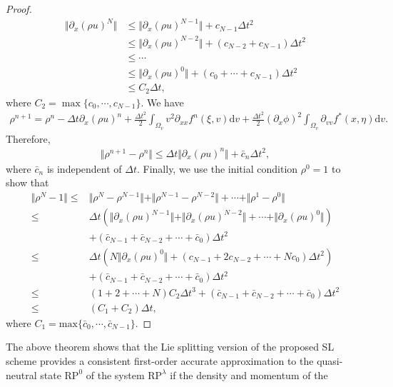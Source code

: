 \documentclass[letterpaper,10pt]{article}
\numberwithin{equation}{section}
\numberwithin{figure}{section}
\numberwithin{table}{section}
\begin{document}
\begin{proof}
\begin{align*}
    \Vert \partial_x(\rho u)^N\Vert&\leq\Vert\partial_x(\rho u)^{N-1}\Vert+c_{N-1}\Delta t^2\\
    &\leq\Vert\partial_x(\rho u)^{N-2}\Vert+(c_{N-2}+c_{N-1})\Delta t^2\\
    &\leq\cdots\\
    &\leq\Vert\partial_x(\rho u)^0\Vert+(c_0+\cdots+c_{N-1})\Delta t^2\\
    &\leq C_2\Delta t,
\end{align*}
where $C_2=\max\{c_0,\cdots,c_{N-1}\}$. We have
\begin{align*}
    \rho^{n+1}=\rho^n-\Delta t\partial_x(\rho u)^n+\frac{\Delta t^2}{2}\int_{\Omega_v}v^2\partial_{xx}f^n(\xi,v)\mathrm dv+\frac{\Delta t^2}{2}(\partial_x\phi)^2\int_{\Omega_v}\partial_{vv}f^*(x,\eta)\mathrm dv.
\end{align*}
Therefore,
\begin{align*}
    \Vert\rho^{n+1}-\rho^n\Vert\leq\Delta t\Vert\partial_x(\rho u)^n\Vert+\bar{c}_{n}\Delta t^2,
\end{align*}
where $\bar{c}_n$ is independent of $\Delta t$. Finally, we use
the initial condition $\rho^0=1$ to show that
\begin{align*}
    \Vert \rho^N-1\Vert\leq& \Vert\rho^N-\rho^{N-1}\Vert+\Vert \rho^{N-1}-\rho^{N-2}\Vert+\cdots+\Vert\rho^1-\rho^0\Vert\\
    \leq& \Delta t\left(\Vert\partial_x(\rho u)^{N-1}\Vert+\Vert\partial_x(\rho u)^{N-2}\Vert+\cdots+\Vert\partial_x(\rho u)^0\Vert\right)\\
    &+\left(\bar{c}_{N-1}+\bar{c}_{N-2}+\cdots+\bar{c}_0\right)\Delta t^2\\
    \leq& \Delta t\left(N\Vert\partial_x(\rho u)^0\Vert+(c_{N-1}+2c_{N-2}+\cdots+Nc_0)\Delta t^2\right)\\
    &+\left(\bar{c}_{N-1}+\bar{c}_{N-2}+\cdots+\bar{c}_0\right)\Delta t^2\\
    \leq& (1+2+\cdots+N)C_2\Delta t^3+\left(\bar{c}_{N-1}+\bar{c}_{N-2}+\cdots+\bar{c}_0\right)\Delta t^2\\
    \leq& (C_1+C_2)\Delta t,
\end{align*}
where $C_1=\text{max}\{\bar{c}_0,\cdots,\bar{c}_{N-1}\}$.
\end{proof}
The above theorem shows that the Lie splitting version of the proposed SL scheme
provides a consistent first-order accurate approximation to the quasi-neutral state 
$\text{RP}^0$ of the system $\text{RP}^\lambda$ if the density and momentum of the
\end{document}
